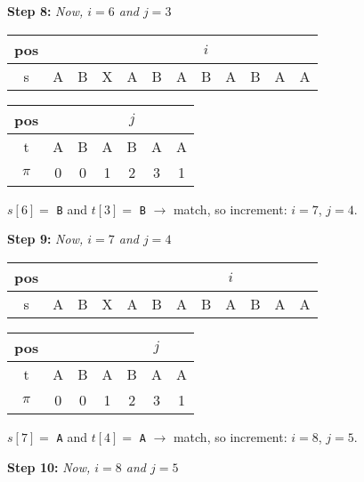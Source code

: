 \textbf{Step 8: }\textit{Now, $i = 6$ and $j = 3$}

\begin{table}[H]
\centering
\begin{tabular}{|c|c|c|c|c|c|c|c|c|c|c|c|}
\hline
pos   &   &   &   &   &   &   &$i$&   &   &   &   \\ \hline
s     & A & B & X & A & B & A & B & A & B & A & A \\ \hline
\end{tabular}
\end{table}

\begin{table}[H]
\centering
\begin{tabular}{|c|c|c|c|c|c|c|}
\hline
pos   &   &   &   &$j$&   &   \\ \hline
t     & A & B & A & B & A & A \\ \hline
$\pi$ & 0 & 0 & 1 & 2 & 3 & 1 \\ \hline
\end{tabular}
\end{table}

$s[6] = $ \texttt{B} and $t[3] = $ \texttt{B} $\longrightarrow$ match, so increment: $i = 7$, $j = 4$.

\textbf{Step 9: }\textit{Now, $i = 7$ and $j = 4$}

\begin{table}[H]
\centering
\begin{tabular}{|c|c|c|c|c|c|c|c|c|c|c|c|}
\hline
pos   &   &   &   &   &   &   &   &$i$&   &   &   \\ \hline
s     & A & B & X & A & B & A & B & A & B & A & A \\ \hline
\end{tabular}
\end{table}

\begin{table}[H]
\centering
\begin{tabular}{|c|c|c|c|c|c|c|}
\hline
pos   &   &   &   &   &$j$&   \\ \hline
t     & A & B & A & B & A & A \\ \hline
$\pi$ & 0 & 0 & 1 & 2 & 3 & 1 \\ \hline
\end{tabular}
\end{table}

$s[7] = $ \texttt{A} and $t[4] = $ \texttt{A} $\longrightarrow$ match, so increment: $i = 8$, $j = 5$.

\textbf{Step 10: }\textit{Now, $i = 8$ and $j = 5$}


